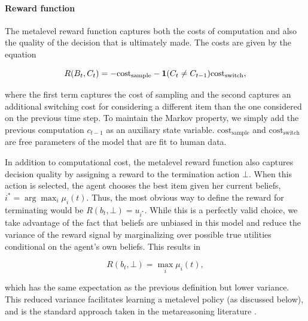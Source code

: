 \documentclass[12pt,a4paperpaper,]{article}
\begin{document}
\paragraph{Reward function}
The metalevel reward function captures both the costs of computation and also the quality of the decision that is ultimately made. The costs are given by the equation

\begin{equation}
R(B_t, C_t) = -\text{cost}_\text{sample} - \mathbf{1}(C_t \neq C_{t-1}) \text{cost}_\text{switch}
,
\end{equation}

where the first term captures the cost of sampling and the second captures an additional switching cost for considering a different item than the one considered on the previous time step. To maintain the Markov property, we simply add the previous computation $c_{t-1}$ as an auxiliary state variable. ${\text{cost}_\text{sample}}$ and ${\text{cost}_\text{switch}}$ are free parameters of the model that are fit to human data.

In addition to computational cost, the metalevel reward function also captures decision quality by assigning a reward to the termination action $\bot$. When this action is selected, the agent chooses the best item given her current beliefs, $i^* = \arg\max_i \mu_i(t)$. Thus, the most obvious way to define the reward for terminating would be $R(b_t, \bot) = u_{i^*}$. While this is a perfectly valid choice, we take advantage of the fact that beliefs are unbiased in this model and reduce the variance of the reward signal by marginalizing over possible true utilities conditional on the agent's own beliefs. This results in

\begin{equation}
R(b_t, \bot) = \max_i \mu_i(t)
, 
\end{equation}

which has the same expectation as the previous definition but lower variance. This reduced variance facilitates learning a metalevel policy (as discussed below), and is the standard approach taken in the metareasoning literature \citep{Hay2012}.
\end{document}
